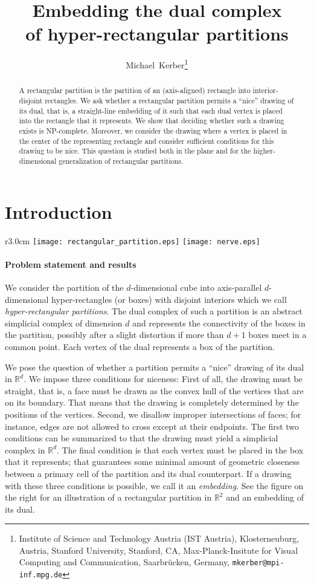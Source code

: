 \documentclass[12pt]{article}
\title{Embedding the dual complex\\
  of hyper-rectangular partitions
  }
\author{Michael~Kerber\thanks{Institute of Science and Technology Austria (IST Austria), Klosterneuburg, Austria, 
          Stanford University, Stanford, CA,
          Max-Planck-Insitute for Visual Computing and Communication, Saarbr\"ucken, Germany,  
          \texttt{mkerber@mpi-inf.mpg.de}}
}
\newcommand{\R}{\mathbb{R}}
\begin{document}
\maketitle


\begin{abstract}
A rectangular partition is the partition of an (axis-aligned) rectangle
into interior-disjoint rectangles. We ask whether a rectangular
partition permits a ``nice'' drawing of its dual, 
that is, a straight-line embedding of it 
such that each dual vertex is placed into the rectangle that it represents.
We show that deciding whether such a drawing exists is NP-complete. 
Moreover, we consider the drawing where a vertex is placed in the center
of the representing rectangle and consider sufficient conditions for this drawing
to be nice. This question is studied both in the plane 
and for the higher-dimensional generalization of rectangular partitions.
\end{abstract}

\section{Introduction}

\begin{wrapfigure}[13]{r}{3.0cm}
\vspace{-0.5cm}
\texttt{[image: rectangular\_partition.eps]}
\texttt{[image: nerve.eps]}
\end{wrapfigure}
\paragraph{Problem statement and results}
We consider the partition of the $d$-dimensional cube into axis-parallel 
$d$-dimensional hyper-rectangles (or boxes)
with disjoint interiors which we call \emph{hyper-rectangular partitions}. 
The dual complex of such a partition is an abstract simplicial complex of dimension $d$
and represents the connectivity of the boxes in the partition, possibly after a slight distortion
if more than $d+1$ boxes meet in a common point. Each vertex of the dual represents
a box of the partition. 

We pose the question of whether a partition permits a ``nice'' drawing of its dual in $\R^d$. 
We impose three conditions for niceness: First of all, the drawing must be straight, that is,
a face must be drawn as the convex hull of the vertices that are on its boundary. That means that
the drawing is completely determined by the positions of the vertices. Second, we disallow
improper intersections of faces; for instance, edges are not allowed to cross except at their 
endpoints. The first two conditions can be summarized to that the drawing must yield a simplicial
complex in $\R^d$. The final condition is that each vertex must be placed in the box that it
represents; that guarantees some minimal amount of geometric closeness between
a primary cell of the partition and its dual counterpart.
If a drawing with these three conditions is possible, we call it an \emph{embedding}.
See the figure on the right for an illustration of a rectangular partition in $\R^2$ and an embedding of its dual.
\end{document}
